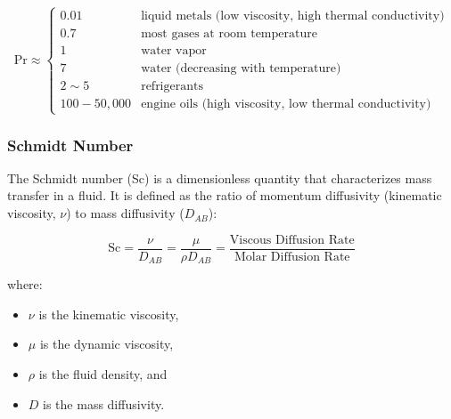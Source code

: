 \[
    \text{Pr} \approx \left\{
    \begin{array}{ll}
         0.01 &  \text{liquid metals (low viscosity, high thermal conductivity)}
         \\[0.3em]
         0.7 &  \text{most gases at room temperature}  
         \\
         1 & \text{water vapor}
         \\[0.3em]
         7 &  \text{water (decreasing with temperature)}
         \\[0.3em]
         2  \sim 5 &  \text{refrigerants}
         \\[0.3em]
         100-50,000 &  \text{engine oils (high viscosity, low thermal conductivity)}
    \end{array}
    \right.
\]


\subsubsection*{Schmidt Number}

The Schmidt number (Sc) is a dimensionless quantity that characterizes mass transfer in a fluid. It is defined as the ratio of momentum diffusivity (kinematic viscosity, \(\nu\)) to mass diffusivity (\(D_{AB}\)):
\begin{definition}
   \[
        \text{Sc} = \frac{\nu}{D_{AB}} = \frac{\mu}{\rho D_{AB}} =\frac{\text{Viscous Diffusion Rate}}{\text{Molar Diffusion Rate}}
    \] 
\end{definition}
%
where:
\begin{itemize}[-]
    \item \(\nu\) is the kinematic viscosity,
    \item \(\mu\) is the dynamic viscosity,
    \item \(\rho\) is the fluid density, and
    \item \(D\) is the mass diffusivity.
\end{itemize}
